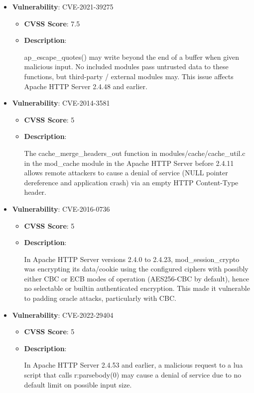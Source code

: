 \documentclass{article}
\begin{document}
\begin{itemize}
        \item \textbf{Vulnerability}: CVE-2021-39275
        \begin{itemize}
            \item \textbf{CVSS Score}:  7.5 
            \item \textbf{Description}:
            \parbox[t]{0.9\linewidth}{
                \ttfamily ap\_escape\_quotes() may write beyond the end of a buffer when given malicious input. No included modules pass untrusted data to these functions, but third-party / external modules may. This issue affects Apache HTTP Server 2.4.48 and earlier.
            }
        \end{itemize}
    
        \item \textbf{Vulnerability}: CVE-2014-3581
        \begin{itemize}
            \item \textbf{CVSS Score}:  5 
            \item \textbf{Description}:
            \parbox[t]{0.9\linewidth}{
                \ttfamily The cache\_merge\_headers\_out function in modules/cache/cache\_util.c in the mod\_cache module in the Apache HTTP Server before 2.4.11 allows remote attackers to cause a denial of service (NULL pointer dereference and application crash) via an empty HTTP Content-Type header.
            }
        \end{itemize}
    
        \item \textbf{Vulnerability}: CVE-2016-0736
        \begin{itemize}
            \item \textbf{CVSS Score}:  5 
            \item \textbf{Description}:
            \parbox[t]{0.9\linewidth}{
                \ttfamily In Apache HTTP Server versions 2.4.0 to 2.4.23, mod\_session\_crypto was encrypting its data/cookie using the configured ciphers with possibly either CBC or ECB modes of operation (AES256-CBC by default), hence no selectable or builtin authenticated encryption. This made it vulnerable to padding oracle attacks, particularly with CBC.
            }
        \end{itemize}
    
        \item \textbf{Vulnerability}: CVE-2022-29404
        \begin{itemize}
            \item \textbf{CVSS Score}:  5 
            \item \textbf{Description}:
            \parbox[t]{0.9\linewidth}{
                \ttfamily In Apache HTTP Server 2.4.53 and earlier, a malicious request to a lua script that calls r:parsebody(0) may cause a denial of service due to no default limit on possible input size.
            }
        \end{itemize}
    

\end{itemize}
\end{document}
